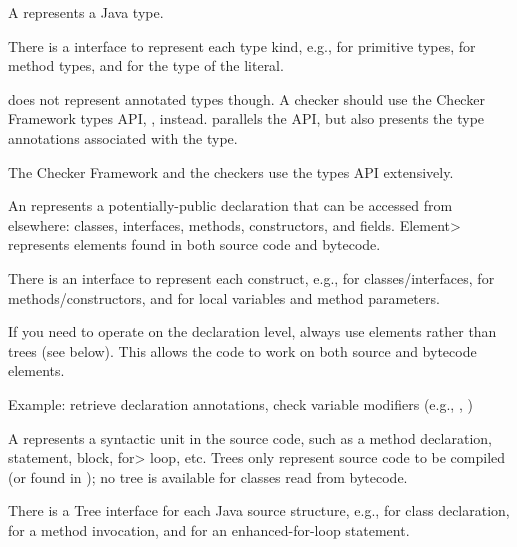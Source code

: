 A  represents a Java type.

\begin{sloppypar}
There is a  interface to represent each type kind,
e.g.,  for primitive types, 
for method types, and  for the type of the  literal.
\end{sloppypar}

 does not represent annotated types though.  A checker
should use the Checker Framework types API,
, instead.  
parallels the  API, but also presents the type annotations
associated with the type.

The Checker Framework and the checkers use the types API extensively.



An  represents a potentially-public
declaration that can be accessed from elsewhere:  classes, interfaces, methods, constructors, and
fields.  \<Element> represents elements found in both source
code and bytecode.

There is an  interface to represent each construct, e.g.,
 for classes/interfaces,  for
methods/constructors, and  for local variables and
method parameters.

If you need to operate on the declaration level, always use elements rather
than trees
(see below).  This allows the code to work on
both source and bytecode elements.

Example: retrieve declaration annotations, check variable
modifiers (e.g., , )



A  represents a syntactic unit in the source code,
such as a method declaration, statement, block, \<for> loop, etc. Trees only
represent source code to be compiled (or found in );
no tree is available for classes read from bytecode.

There is a Tree interface for each Java source structure, e.g.,
 for class declaration, 
for a method invocation, and  for an enhanced-for-loop
statement.


